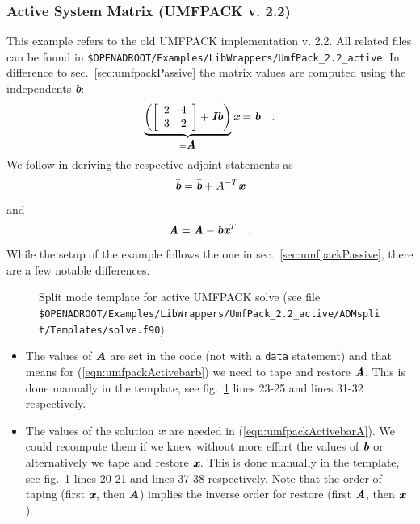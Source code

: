 \documentclass{book}
\newcommand{\bmA}{\mbox{\bf\em A}}
\newcommand{\bmb}{\mbox{\bf\em b}}
\newcommand{\bmI}{\mbox{\bf\em I}}
\newcommand{\bmx}{\mbox{\bf\em x}}
\newcommand{\refsec}[1]{{sec.~\ref{#1}}}
\newcommand{\reffig}[1]{{fig.~\ref{#1}}}
\newcommand{\refeqn}[1]{{(\ref{#1})}}
\begin{document}
\subsubsection{Active System Matrix (UMFPACK v. 2.2)}  \label{sec:umfpackActive}
This example refers to the old UMFPACK implementation v. 2.2.  
All related files can be found in 
\lstinline{$OPENADROOT/Examples/LibWrappers/UmfPack_2.2_active}. %
In difference to \refsec{sec:umfpackPassive} the matrix values are computed using the 
independents \bmb: 
\[
\underbrace{\left(\left[\begin{array}{cc}
2 & 4 \\
3 & 2 
\end{array}\right]
+\bmI\bmb\right)}_{=\bmA}\bmx=\bmb \quad .
\]
We follow \cite{Giles2008CMD} in deriving the respective adjoint statements as 
\begin{equation}
\bar{\bmb}=\bar{\bmb}+A^{-T}\bar{\bmx} \label{eqn:umfpackActivebarb}
\end{equation}
and 
\begin{equation}
\bar{\bmA}=\bar{\bmA}-\bar{\bmb}\bmx^T \quad.\label{eqn:umfpackActivebarA}
\end{equation}
While the setup of the example follows the one in \refsec{sec:umfpackPassive}, there are a few notable 
differences. 
\begin{figure}[tb]
\begin{minipage}{\linewidth}
\small
\end{minipage}
\caption{Split mode template for active UMFPACK solve (see file 
\lstinline{$OPENADROOT/Examples/LibWrappers/UmfPack_2.2_active/ADMsplit/Templates/solve.f90}) %
}\label{fig:umf22activeTemplate}
\end{figure}
\begin{itemize}
\item The values of $\bmA$ are set in the code (not with a \lstinline{data} statement) and that means for \refeqn{eqn:umfpackActivebarb}
we need to tape and restore $\bmA$. This is done manually in the template, see \reffig{fig:umf22activeTemplate} lines 23-25 and lines 
31-32 respectively.
\item The values of the solution  $\bmx$ are needed in \refeqn{eqn:umfpackActivebarA}. We could recompute them if we knew without more 
effort the values of $\bmb$ or alternatively 
we tape and restore $\bmx$. This is done manually in the template, see \reffig{fig:umf22activeTemplate} lines 20-21 and lines 
37-38 respectively. Note that the order of taping (first $\bmx$, then $\bmA$) implies the inverse order for restore (first $\bmA$, then $\bmx$).
\end{itemize}
\end{document}
